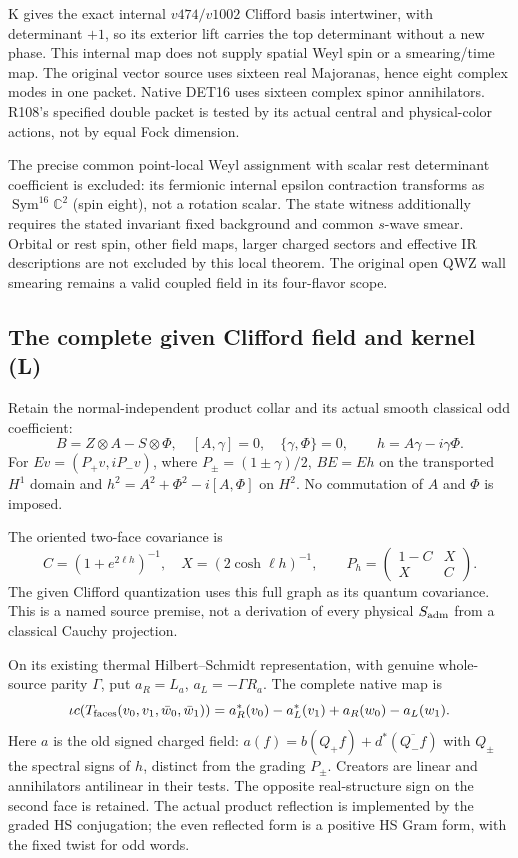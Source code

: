 K gives the exact internal $v474/v1002$ Clifford basis intertwiner,
with determinant $+1$, so its exterior lift carries the top
determinant without a new phase. This internal map does not supply
spatial Weyl spin or a smearing/time map. The original vector source
uses sixteen real Majoranas, hence eight complex modes in one
packet. Native DET16 uses sixteen complex spinor annihilators.
R108's specified double packet is tested by its actual central and
physical-color actions, not by equal Fock dimension.

The precise common point-local Weyl assignment with scalar rest
determinant coefficient is excluded: its fermionic internal
epsilon contraction transforms as $\operatorname{Sym}^{16}\mathbb C^2$
(spin eight), not a rotation scalar. The state witness additionally
requires the stated invariant fixed background and common $s$-wave
smear. Orbital or rest spin, other field maps, larger charged sectors
and effective IR descriptions are not excluded by this local theorem.
The original open QWZ wall smearing remains a valid coupled field in
its four-flavor scope.

\subsection*{The complete given Clifford field and kernel (L)}

Retain the normal-independent product collar and its actual smooth
classical odd coefficient:
\[
 B=Z\otimes A-S\otimes\Phi,\quad
 [A,\gamma]=0,\quad \{\gamma,\Phi\}=0,\qquad
 h=A\gamma-i\gamma\Phi .
\]
For $Ev=(P_+v,iP_-v)$, where $P_\pm=(1\pm\gamma)/2$,
$BE=Eh$ on the transported $H^1$ domain and
$h^2=A^2+\Phi^2-i[A,\Phi]$ on $H^2$.
No commutation of $A$ and $\Phi$ is imposed.

The oriented two-face covariance is
\[
 C=(1+e^{2\ell h})^{-1},\quad X=(2\cosh\ell h)^{-1},\qquad
 P_h=\begin{pmatrix}1-C&X\\X&C\end{pmatrix}.
\]
The given Clifford quantization uses this full graph as its quantum
covariance. This is a named source premise, not a derivation of every
physical $S_{\rm adm}$ from a classical Cauchy projection.

On its existing thermal Hilbert--Schmidt representation, with genuine
whole-source parity $\Gamma$, put
$a_R=L_a$, $a_L=-\Gamma R_a$.
The complete native map is
\[
 \iota c\!\left(T_{\rm faces}
 (v_0,v_1,\bar w_0,\bar w_1)\right)
 =a_R^*(v_0)-a_L^*(v_1)+a_R(w_0)-a_L(w_1).
\]
Here $a$ is the old signed charged field:
$a(f)=b(Q_+f)+d^*(\overline{Q_-f})$ with $Q_\pm$ the spectral signs
of $h$, distinct from the grading $P_\pm$. Creators are linear and
annihilators antilinear in their tests. The opposite real-structure
sign on the second face is retained. The actual product reflection is
implemented by the graded HS conjugation; the even reflected form is
a positive HS Gram form, with the fixed twist for odd words.

